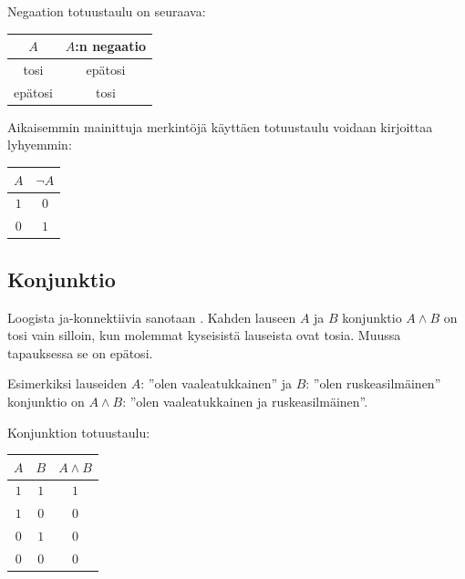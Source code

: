 Negaation totuustaulu on seuraava:


\bigskip

\begin{center}
\begin{tabular}{|c|c|}\hline
$A$ & $A$:n negaatio \\ \hline
tosi & epätosi \\ 
epätosi & tosi \\
\hline
\end{tabular}
\end{center}

\bigskip

Aikaisemmin mainittuja merkintöjä käyttäen totuustaulu voidaan kirjoittaa lyhyemmin:

\bigskip

\begin{center}
\begin{tabular}{|c|c|}\hline
$A$ & $\lnot A$ \\ \hline
$1$ & $0$\\ 
$0$ & $1$ \\ \hline
\end{tabular}
\end{center}

\bigskip

\subsection*{Konjunktio}
Loogista ja-konnektiivia sanotaan . Kahden lauseen $A$ ja $B$ konjunktio $A\land B$ on tosi vain silloin, kun molemmat kyseisistä lauseista ovat tosia. Muussa tapauksessa se on epätosi.

Esimerkiksi lauseiden $A$: ''olen vaaleatukkainen'' ja $B$: ''olen ruskeasilmäinen'' konjunktio on $A \land B$: ''olen vaaleatukkainen ja ruskeasilmäinen''. 

\newpage

Konjunktion totuustaulu:

\bigskip

\begin{center}
\begin{tabular}{|c|c|c|}\hline
$A$ & $B$ & $A\land B$ \\ \hline
$1$ & $1$ & $1$\\ 
$1$ & $0$ & $0$\\
$0$ & $1$ & $0$\\
$0$ & $0$ & $0$\\
\hline
\end{tabular}
\end{center}

